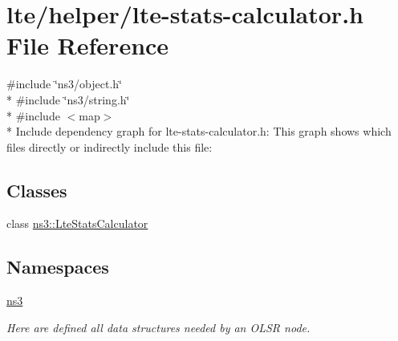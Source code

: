 \hypertarget{lte-stats-calculator_8h}{}\section{lte/helper/lte-\/stats-\/calculator.h File Reference}
\label{lte-stats-calculator_8h}
{\ttfamily \#include \char`\"{}ns3/object.\+h\char`\"{}}\\*
{\ttfamily \#include \char`\"{}ns3/string.\+h\char`\"{}}\\*
{\ttfamily \#include $<$map$>$}\\*
Include dependency graph for lte-\/stats-\/calculator.h\+:
This graph shows which files directly or indirectly include this file\+:
\subsection*{Classes}
\begin{DoxyCompactItemize}
\item 
class \hyperlink{classns3_1_1LteStatsCalculator}{ns3\+::\+Lte\+Stats\+Calculator}
\end{DoxyCompactItemize}
\subsection*{Namespaces}
\begin{DoxyCompactItemize}
\item 
 \hyperlink{namespacens3}{ns3}
\begin{DoxyCompactList}\small\item\em Here are defined all data structures needed by an O\+L\+SR node. \end{DoxyCompactList}\end{DoxyCompactItemize}
